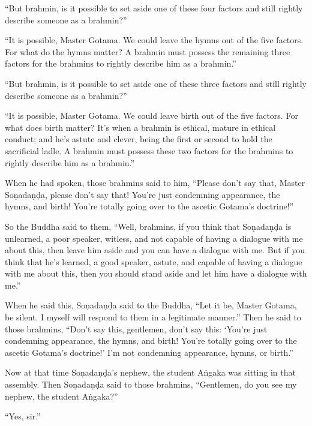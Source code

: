 \documentclass[12pt,openany]{book}%
\begin{document}
“But brahmin, is it possible to set aside one of these four factors and still rightly describe someone as a brahmin?” 

“It is possible, Master Gotama. We could leave the hymns out of the five factors. For what do the hymns matter? A brahmin must possess the remaining three factors for the brahmins to rightly describe him as a brahmin.” 

“But brahmin, is it possible to set aside one of these three factors and still rightly describe someone as a brahmin?” 

“It is possible, Master Gotama. We could leave birth out of the five factors. For what does birth matter? It’s when a brahmin is ethical, mature in ethical conduct; and he’s astute and clever, being the first or second to hold the sacrificial ladle. A brahmin must possess these two factors for the brahmins to rightly describe him as a brahmin.” 

When he had spoken, those brahmins said to him, “Please don’t say that, Master \textsanskrit{Soṇadaṇḍa}, please don’t say that! You’re just condemning appearance, the hymns, and birth! You’re totally going over to the ascetic Gotama’s doctrine!” 

So the Buddha said to them, “Well, brahmins, if you think that \textsanskrit{Soṇadaṇḍa} is unlearned, a poor speaker, witless, and not capable of having a dialogue with me about this, then leave him aside and you can have a dialogue with me. But if you think that he’s learned, a good speaker, astute, and capable of having a dialogue with me about this, then you should stand aside and let him have a dialogue with me.” 

When he said this, \textsanskrit{Soṇadaṇḍa} said to the Buddha, “Let it be, Master Gotama, be silent. I myself will respond to them in a legitimate manner.” Then he said to those brahmins, “Don’t say this, gentlemen, don’t say this: ‘You’re just condemning appearance, the hymns, and birth! You’re totally going over to the ascetic Gotama’s doctrine!’ I’m not condemning appearance, hymns, or birth.” 

Now at that time \textsanskrit{Soṇadaṇḍa}’s nephew, the student \textsanskrit{Aṅgaka} was sitting in that assembly. Then \textsanskrit{Soṇadaṇḍa} said to those brahmins, “Gentlemen, do you see my nephew, the student \textsanskrit{Aṅgaka}?” 

“Yes, sir.” 
\end{document}

